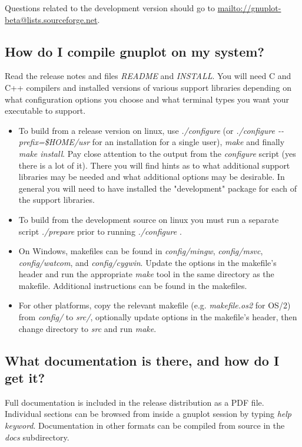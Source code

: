 \documentclass[a4paper,11pt]{article}
\def\mailto#1{{\small\href{mailto://#1}{\url{mailto://#1}}}}
\newcommand{\mailto}[1]%
            {\htmladdnormallink{\latex{\url{<#1>}}\html{\textit{#1}}}%
                {mailto:#1}%
            }
\newcommand{\gnuplot}{\textbf{gnuplot }}
\begin{document}
Questions related to the development version should go to
\mailto{gnuplot-beta@lists.sourceforge.net}.


\subsection{How do I compile \gnuplot on my system?}

Read the release notes and files \textit{README} and \textit{INSTALL}.
You will need C and C++ compilers and installed versions of various
support libraries depending on what configuration options you choose and what
terminal types you want your executable to support.

\begin{itemize}
\item
To build from a release version on linux, use \textit{./configure} (or \textit{./configure {-}{-}prefix=\$HOME/usr}
for an installation for a single user), \textit{make} and finally
\textit{make install}.  Pay close attention to the output from the \textit{configure}
script (yes there is a lot of it).
There you will find hints as to what additional support libraries may be needed and
what additional options may be desirable.  In general you will need to have installed
the "development" package for each of the support libraries.
\item
To build from the development source on linux you must run a separate script \textit{./prepare}
prior to running \textit{./configure} .
\item
On Windows, makefiles can be found in \textit{config/mingw}, \textit{config/msvc},
\textit{config/watcom}, and \textit{config/cygwin}. Update the options in the
makefile's header and run the appropriate \textit{make} tool in the same directory
as the makefile. Additional instructions can be found in the makefiles.
\item
For other platforms, copy the relevant makefile (e.g. \textit{makefile.os2} for
OS/2) from \textit{config/} to \textit{src/}, optionally update options in the
makefile's header, then change directory to \textit{src} and run \textit{make}.
\end{itemize}


\subsection{What documentation is there, and how do I get it?}

Full documentation is included in the release distribution as a PDF file.
Individual sections can be browsed from inside a gnuplot session
by typing \textit{help {\em keyword}}.
Documentation in other formats can be compiled from source in the
{\em docs} subdirectory.
\end{document}
